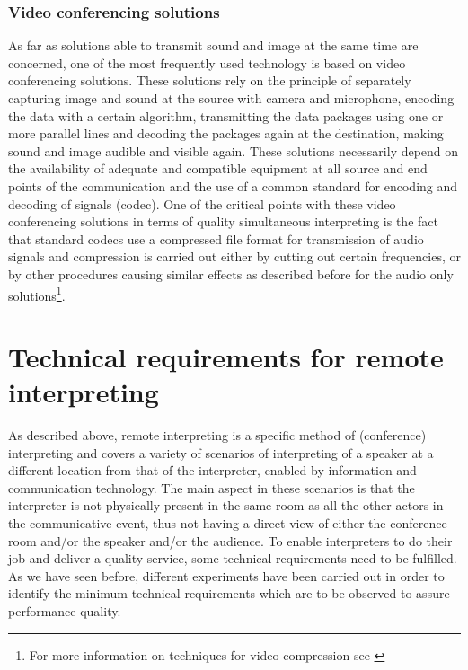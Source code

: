 \documentclass[output=paper]{langsci/langscibook}
\begin{document}
\subsubsection{Video conferencing solutions}

As far as solutions able to transmit sound and image at the same time are concerned, one of the most frequently used technology is based on video conferencing solutions. These solutions rely on the principle of separately capturing image and sound at the source with camera and microphone, encoding the data with a certain algorithm, transmitting the data packages using one or more parallel lines and decoding the packages again at the destination, making sound and image audible and visible again. These solutions necessarily depend on the availability of adequate and compatible equipment at all source and end points of the communication and the use of a common standard for encoding and decoding of signals (codec). One of the critical points with these video conferencing solutions in terms of quality simultaneous interpreting is the fact that standard codecs use a compressed file format for transmission of audio signals and compression is carried out either by cutting out certain frequencies, or by other procedures causing similar effects as described before for the audio only solutions\footnote{For more information on techniques for video compression see \citet{Wiegand2003}}.

\section{Technical requirements for remote interpreting}

As described above, remote interpreting is a specific method of (conference) interpreting and covers a variety of scenarios of interpreting of a speaker at a different location from that of the interpreter, enabled by information and communication technology. The main aspect in these scenarios is that the interpreter is not physically present in the same room as all the other actors in the communicative event, thus not having a direct view of either the conference room and/or the speaker and/or the audience. To enable interpreters to do their job and deliver a quality service, some technical requirements need to be fulfilled. As we have seen before, different experiments have been carried out in order to identify the minimum technical requirements which are to be observed to assure performance quality.
\end{document}
